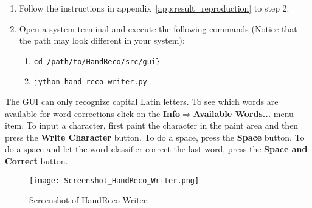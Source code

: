 \begin{enumerate}
 \item Follow the instructions in appendix~\ref{app:result_reproduction} to step 2.
 \item Open a system terminal and execute the following commands (Notice that the path may look different in your system):
 \begin{enumerate}
  \item \verb|cd /path/to/HandReco/src/gui}|
  \item \verb|jython hand_reco_writer.py|
 \end{enumerate}
\end{enumerate}

The GUI can only recognize capital Latin letters. To see which words are available for word corrections click on the \textbf{Info$\Rightarrow$Available Words...} menu item. To input a character, first paint the character in the paint area and then press the \textbf{Write Character} button. To do a space, press the \textbf{Space} button. To do a space and let the word classifier correct the last word, press the \textbf{Space and Correct} button.

    \begin{figure}[htb] 
      \begin{center}
	\leavevmode
	\texttt{[image: Screenshot\_HandReco\_Writer.png]}%
      \end{center}
      \caption{Screenshot of HandReco Writer.}
      \label{fig:hand_reco_writer_screenshot}
    \end{figure}
